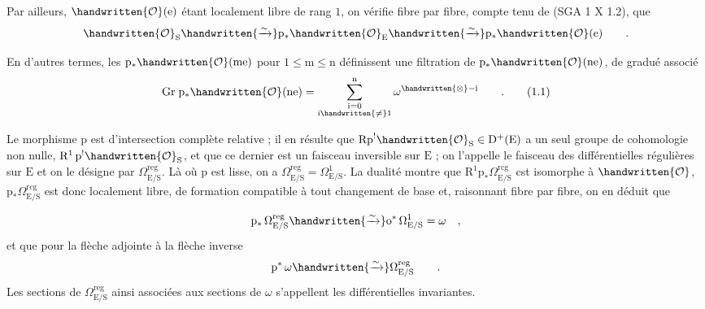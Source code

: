 Par ailleurs, $\handwritten{\mathcal{O}}(\mathrm{e})$ étant localement libre de rang $1$, on vérifie fibre par fibre, compte tenu de (SGA 1 X 1.2), que
\[
\handwritten{\mathcal{O}}_{\mathrm{S}}\handwritten{\xrightarrow{\sim}}
\mathrm{p}_{*}\handwritten{\mathcal{O}}_{\mathrm{E}}\handwritten{\xrightarrow{\sim}}
\mathrm{p}_{*}\handwritten{\mathcal{O}}(\mathrm{e})\qquad.
\]

En d'autres termes, les $\mathrm{p}_{*}\handwritten{\mathcal{O}}(\mathrm{me})$ pour $1\leq\mathrm{m}\leq\mathrm{n}$ définissent une filtration de $\mathrm{p}_{*}\handwritten{\mathcal{O}}(\mathrm{ne})$, de gradué associé
\makeatletter\tagsleft@true\makeatother
\[
\mathrm{Gr}\;\mathrm{p}_{*}\handwritten{\mathcal{O}}(\mathrm{ne})
=\sum_{\substack{\mathrm{i}=0\\\mathrm{i}\handwritten{\neq}1}}^{\mathrm{n}}\omega^{\handwritten{\otimes}-\mathrm{i}}\qquad.
\tag*{(1.1)}
\]

Le morphisme $\mathrm{p}$ est d'intersection complète relative ; il en résulte que $\mathrm{Rp}^{!}\handwritten{\mathcal{O}}_{\mathrm{S}}\in\mathrm{D}^{+}(\mathrm{E})$ a un seul groupe de cohomologie non nulle, $\mathrm{R}^{1}\,\mathrm{p}^{!}\handwritten{\mathcal{O}}_{\mathrm{S}}$, et que ce dernier est un faisceau inversible sur $\mathrm{E}$ ; on l'appelle le faisceau des différentielles régulières sur $\mathrm{E}$ et on le désigne par $\Omega^{\mathrm{reg}}_{\mathrm{E}/\mathrm{S}}$. Là où $\mathrm{p}$ est lisse, on a $\Omega^{\mathrm{reg}}_{\mathrm{E}/\mathrm{S}}=\Omega^{1}_{\mathrm{E}/\mathrm{S}}$. La dualité montre que $\mathrm{R}^{1}\mathrm{p}_{*}\Omega^{\mathrm{rcg}}_{\mathrm{E}/\mathrm{S}}$ cst isomorphe à $\handwritten{\mathcal{O}}$, $\mathrm{p}_{*}\Omega^{\mathrm{rcg}}_{\mathrm{E}/\mathrm{S}}$ est donc \handwritten{/} localement libre, de formation compatible à tout changement de base et, raisonnant fibre par fibre, on en déduit que
\endgroup
\clearpage

\begingroup
\makeatletter\tagsleft@true\makeatother
\normalmarginpar
\[
\mathrm{p}_{*}\,\Omega^{\mathrm{reg}}_{\mathrm{E}/\mathrm{S}}\handwritten{\xrightarrow{\sim}}\mathrm{o}^{*}\,\Omega^{1}_{\mathrm{E}/\mathrm{S}}=\omega\quad,
\]
et que pour la flèche adjointe à la flèche inverse
\[
\mathrm{p}^{*}\,\omega\handwritten{\xrightarrow{\sim}}\Omega^{\mathrm{reg}}_{\mathrm{E}/\mathrm{S}}\qquad.
\]
Les sections de $\Omega^{\mathrm{reg}}_{\mathrm{E}/\mathrm{S}}$ ainsi associées aux sections de $\omega$ s'appellent les différentielles invariantes.

